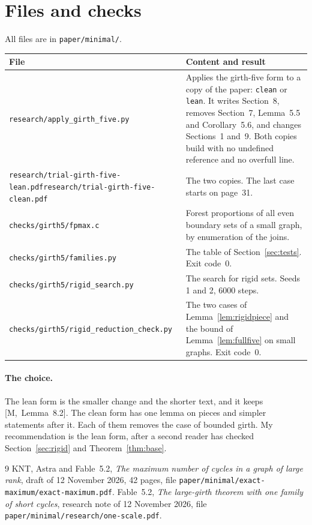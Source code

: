 \documentclass[11pt]{article}
\newcommand{\M}[1]{[M,~#1]}
\begin{document}
\section{Files and checks}\label{sec:files}

All files are in \texttt{paper/minimal/}.
\begin{center}
\small
\begin{tabular}{@{}p{7.3cm}p{6.9cm}@{}}
\toprule
File & Content and result\\
\midrule
\texttt{research/apply\_girth\_five.py} & Applies the girth-five form to a copy of the paper:
\texttt{clean} or \texttt{lean}. It writes Section~8, removes Section~7, Lemma~5.5 and
Corollary~5.6, and changes Sections~1 and~9. Both copies build with no undefined reference and
no overfull line.\\\addlinespace
\texttt{research/trial-girth-five-lean.pdf}\newline\texttt{research/trial-girth-five-clean.pdf}
& The two copies. The last case starts on page~31.\\\addlinespace
\texttt{checks/girth5/fpmax.c} & Forest proportions of all even boundary sets of a small
graph, by enumeration of the joins.\\\addlinespace
\texttt{checks/girth5/families.py} & The table of Section~\ref{sec:tests}. Exit
code~0.\\\addlinespace
\texttt{checks/girth5/rigid\_search.py} & The search for rigid sets. Seeds 1 and 2, 6000 steps.\\\addlinespace
\texttt{checks/girth5/rigid\_reduction\_check.py} & The two cases of
Lemma~\ref{lem:rigidpiece} and the bound of Lemma~\ref{lem:fullfive} on small graphs. Exit
code~0.\\
\bottomrule
\end{tabular}
\end{center}

\paragraph{The choice.} The lean form is the smaller change and the shorter text, and it keeps
\M{Lemma~8.2}. The clean form has one lemma on pieces and simpler statements after it. Each of
them removes the case of bounded girth. My recommendation is the lean form, after a second
reader has checked Section~\ref{sec:rigid} and Theorem~\ref{thm:base}.

\begin{thebibliography}{9}\small
{} KNT, Astra and Fable~5.2, \emph{The maximum number of cycles in a graph of large
rank}, draft of 12 November 2026, 42 pages, file
\texttt{paper/minimal/exact-maximum/exact-maximum.pdf}.
 Fable~5.2, \emph{The large-girth theorem with one family of short cycles},
research note of 12 November 2026, file \texttt{paper/minimal/research/one-scale.pdf}.
\end{thebibliography}
\end{document}
